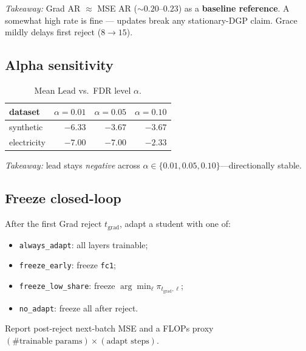 \documentclass[11pt]{article}
\newcommand{\Lead}{\mathrm{Lead}}
\begin{document}
\noindent\textit{Takeaway:} Grad AR $\approx$ MSE AR
($\sim 0.20$--$0.23$) as a \textbf{baseline reference}. A somewhat high
rate is fine --- updates break any stationary-DGP claim. Grace mildly
delays first reject ($8\to 15$).

\subsection{Alpha sensitivity}
\label{sec:alpha}

\begin{table}[h]
\centering
\caption{Mean $\Lead$ vs.\ FDR level $\alpha$.}
\label{tab:alpha}
\begin{tabular}{lrrr}
\toprule
dataset & $\alpha=0.01$ & $\alpha=0.05$ & $\alpha=0.10$ \\
\midrule
synthetic   & $-6.33$ & $-3.67$ & $-3.67$ \\
electricity & $-7.00$ & $-7.00$ & $-2.33$ \\
\bottomrule
\end{tabular}
\end{table}

\noindent\textit{Takeaway:} lead stays \emph{negative} across
$\alpha\in\{0.01,0.05,0.10\}$---directionally stable.

\subsection{Freeze closed-loop}
\label{sec:freeze}

After the first Grad reject $t_{\mathrm{grad}}$, adapt a student with
one of:
\begin{itemize}[leftmargin=*,itemsep=0.2em]
  \item \texttt{always\_adapt}: all layers trainable;
  \item \texttt{freeze\_early}: freeze \texttt{fc1};
  \item \texttt{freeze\_low\_share}: freeze
        $\arg\min_{\ell}\pi_{t_{\mathrm{grad}},\ell}$;
  \item \texttt{no\_adapt}: freeze all after reject.
\end{itemize}
Report post-reject next-batch MSE and a FLOPs proxy
$(\#\text{trainable params})\times(\text{adapt steps})$.
\end{document}
